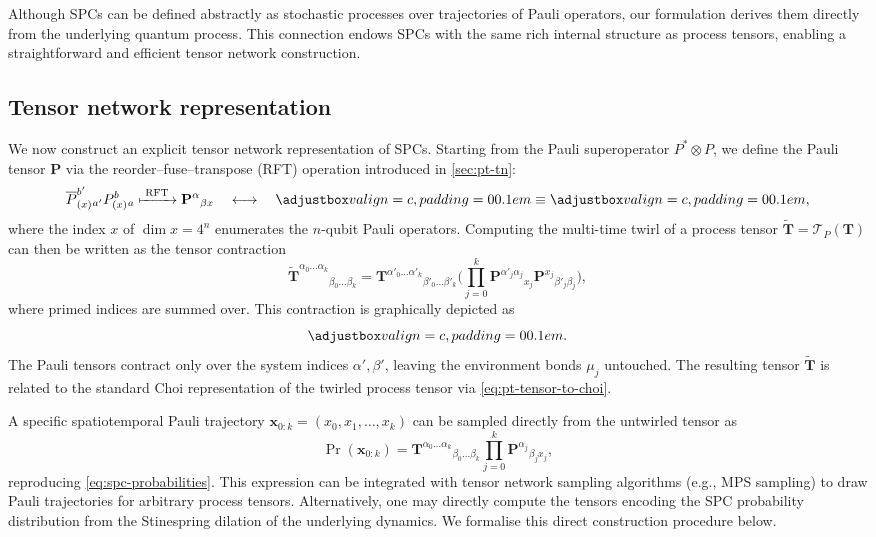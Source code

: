Although SPCs can be defined abstractly as stochastic processes over trajectories of Pauli operators, our formulation derives them directly from the underlying quantum process. This connection endows SPCs with the same rich internal structure as process tensors, enabling a straightforward and efficient tensor network construction.

\subsection{Tensor network representation}
We now construct an explicit tensor network representation of SPCs. Starting from the Pauli superoperator \(P^* \otimes P\), we define the Pauli tensor \(\mathbf{P}\) via the reorder--fuse--transpose (RFT) operation introduced in \cref{sec:pt-tn}:
\begin{equation*}
  \overline{P}_{(x)}^{b'}{}_{a'} P_{(x)}^b{}_a \xmapsto{\;\mathrm{RFT}\;}
  \mathbf{P}^\alpha{}_{\beta x}
  \quad\longleftrightarrow\quad
  \valignbox{}
  \equiv
  \valignbox{},
\end{equation*}
where the index \(x\) of \(\dim{x} = 4^n\) enumerates the \(n\)-qubit Pauli operators. Computing the multi-time twirl of a process tensor \(\widetilde{\mathbf{T}} = \mathcal{T}_P(\mathbf{T})\) can then be written as the tensor contraction
\begin{equation}\label{eq:pt-twirl-tensor}
  \widetilde{\mathbf{T}}^{\alpha_0\dots \alpha_k}{}_{\beta_0 \dots \beta_k} = 
  \mathbf{T}^{\alpha'_0 \dots \alpha'_k}{}_{\beta'_0 \dots \beta'_k}
  \Bigg(
  \prod_{j=0}^k
    \mathbf{P}^{\alpha'_j\alpha_j}{}_{x_j}
    \mathbf{P}^{x_j}{}_{\beta'_j\beta_j}
  \Bigg),
\end{equation}
where primed indices are summed over. This contraction is graphically depicted as
\begin{equation*}
  \valignbox{}.
\end{equation*}
The Pauli tensors contract only over the system indices \(\alpha', \beta'\), leaving the environment bonds \(\mu_j\) untouched. The resulting tensor \(\widetilde{\mathbf{T}}\) is related to the standard Choi representation of the twirled process tensor via \cref{eq:pt-tensor-to-choi}.

A specific spatiotemporal Pauli trajectory \(\mathbf{x}_{0:k} = (x_0, x_1, \ldots, x_k)\) can be sampled directly from the untwirled tensor as
\begin{equation}
  \Pr(\mathbf{x}_{0:k}) = \mathbf{T}^{\alpha_0 \dots \alpha_k}{}_{\beta_0 \dots \beta_k} \prod_{j=0}^k \mathbf{P}^{\alpha_j}{}_{\beta_jx_j},
\end{equation}
reproducing \cref{eq:spc-probabilities}. This expression can be integrated with tensor network sampling algorithms (e.g., MPS sampling) to draw Pauli trajectories for arbitrary process tensors. Alternatively, one may directly compute the tensors encoding the SPC probability distribution from the Stinespring dilation of the underlying dynamics. We formalise this direct construction procedure below.

